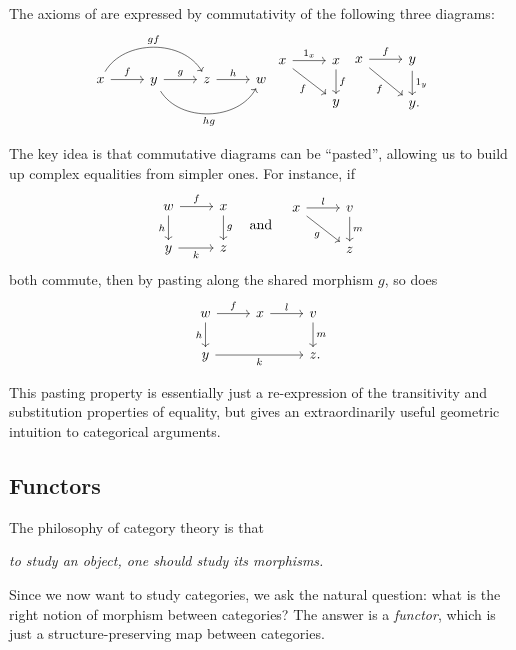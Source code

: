 \begin{ex}
	The axioms of  are expressed by commutativity of the
	following three diagrams:
  \[
		\begin{tikzcd}
			x\ar[r, "f"]\ar[rr, "gf", bend left=60] &
			y\ar[r, "g"]\ar[rr, "hg"', bend right=60] &
			z\ar[r, "h"] & w
		\end{tikzcd}
		\begin{tikzcd}
			x\ar[r, "1_x"]\ar[rd, "f"'] & x\ar[d, "f"] \\
			& y
		\end{tikzcd}
		\begin{tikzcd}
			x\ar[r, "f"]\ar[rd, "f"'] & y\ar[d, "1_y"] \\
			& y\punctuation{.}
		\end{tikzcd}
  \]
\end{ex}

The key idea is that commutative diagrams
can be ``pasted'', allowing us to build up complex equalities from simpler ones.
For instance, if
\[
  \begin{tikzcd}
    w\ar[r, "f"]\ar[d, "h"'] & x\ar[d, "g"] \\
    y\ar[r, "k"'] & z
  \end{tikzcd}\quad
  \text{and}\quad
  \begin{tikzcd}
    x\ar[r, "l"]\ar[rd, "g"'] & v\ar[d, "m"] \\
    & z
  \end{tikzcd}
\] both commute, then by pasting along the shared morphism $g$, so does
\[
  \begin{tikzcd}
    w\ar[r, "f"]\ar[d, "h"'] & x\ar[r, "l"] & v\ar[d, "m"] \\
    y\ar[rr, "k"'] && z\punctuation{.}
  \end{tikzcd}
\]

This pasting property is essentially just a re-expression of the transitivity
and substitution properties of equality, but gives an extraordinarily useful
geometric intuition to categorical arguments.

\subsection{Functors}

The philosophy of category theory is that \begin{center}
  \emph{to study an object, one should study its morphisms.}
\end{center} Since we now want to study categories, we ask
the natural question: what is the right notion of morphism between categories?
The answer is a \emph{functor}, which is just a structure-preserving map between
categories.

